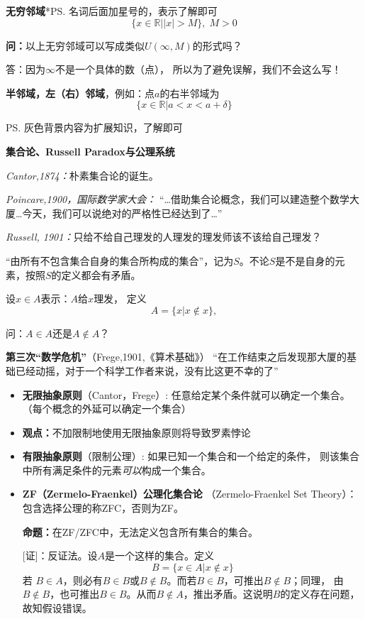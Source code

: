 {\bf 无穷邻域}*\ps{名词后面加星号的，表示了解即可}
$$\{x\in\mathbb{R}||x|>M\},\;M>0$$

{\bf 问：}以上无穷邻域可以写成类似$U(\infty,M)$的形式吗？

答：因为$\infty$不是一个具体的数（点），
所以为了避免误解，我们不会这么写！

{\bf 半邻域，左（右）邻域}，例如：点$a$的右半邻域为
$$\{x\in\mathbb{R}|a<x<a+\delta\}$$

\ps{灰色背景内容为扩展知识，了解即可}

\begin{shaded}

{\bf 集合论、Russell Paradox与公理系统}

	{\it Cantor,1874：}朴素集合论的诞生。	

	{\it Poincare,1900，国际数学家大会：} 
		 {“\ldots 借助集合论概念，我们可以建造整个数学大厦\ldots  今天，我们可以说绝对的严格性已经达到了\ldots”}
	
	{\it Russell, 1901：}只给不给自己理发的人理发的理发师该不该给自己理发？
	
	“由所有不包含集合自身的集合所构成的集合”，记为$S$。不论$S$是不是自身的元素，按照$S$的定义都会有矛盾。
	
	设$x\in A$表示：$A$给$x$理发， 定义
	$$A=\{x|x\notin x\},$$ 
	
	问：$A\in A$还是$A\notin A$？ 
	
	{{\bf {第三次“数学危机”}}（Frege,1901,《算术基础》）}
		“在工作结束之后发现那大厦的基础已经动摇，对于一个科学工作者来说，没有比这更不幸的了”
		
	\begin{itemize}
	  \item {{\bf 无限抽象原则}（Cantor，Frege）:} 任意给定某个条件就可以确定一个集合。（每个概念的外延可以确定一个集合）
	  \item {\bf 观点：}不加限制地使用无限抽象原则将导致罗素悖论
	  \item {{\bf 有限抽象原则}（限制公理）:} 如果已知一个集合和一个给定的条件，
	  则该集合中所有满足条件的元素{\it 可以}构成一个集合。
	  \item {\bf ZF（Zermelo-Fraenkel）公理化集合论}
	  （Zermelo-Fraenkel Set Theory）：包含选择公理的称ZFC，否则为ZF。
	  
	  {\bf 命题：}在ZF/ZFC中，无法定义包含所有集合的集合。
	
	[证]：反证法。设$A$是一个这样的集合。定义
	$$B=\{x\in A|x\notin x\}$$
	若
	$B\in A$，则必有$B\in B$或$B\notin B$。而若$B\in B$，可推出$B\notin B$；同理，
	由$B\notin B$，也可推出$B\in B$。从而$B\notin A$，推出矛盾。这说明$B$的定义存在问题，故知假设错误。


\end{itemize}
\end{shaded}
